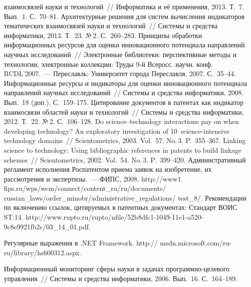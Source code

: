 \begin{multicols}{2}
{{\begin{thebibliography}{99}
взаимосвязей науки и технологий~// Информа\-тика и её применения, 2013. Т.~7. Вып.~1. 
С.~70--81.
 Архитектурные 
решения для систем вы\-чис\-ле\-ния индикаторов тематических взаимосвязей науки и 
технологий~// Сис\-те\-мы и средства информатики, 2013. Т.~23. №\,2. С.~260--283.
 Принципы обработки информационных ресурсов для 
оценки инновационного потенциала направлений научных исследований~// Электронные 
библиотеки: перспективные методы и технологии, электронные коллекции: Труды \mbox{9-й} 
Всеросс. научн. конф. RCDL'2007.~---  Переславль: Университет города Переславля, 2007. 
С.~35--44.
 Информационные ресурсы и индикаторы 
для оценки инновационного потенциала направлений научных исследований~// Сис\-те\-мы 
и средства информатики, 2008. Вып.~18 (доп.). С.~159--175.
 Цитирование документов в патентах как индикатор взаимосвязи 
областей науки и технологий~// Сис\-те\-мы и средства информатики, 2012. Т.~22. №\,2. 
С.~106--128.
 Do 
science--technology interactions pay on when developing technology? An exploratory investigation 
of 10~science-intensive technology domains~// Scientometrics, 2003. Vol.~57. No.\,3. 
P.~355--367.
 Linking 
science to technology: Using bibliographic references in patents to build linkage schemes~// 
Scientometrics, 2002. Vol.~54. No.\,3. P.~399--420.
Административный регламент исполнения Роспатентом приема заявок на изобретение, их 
рас\-смот\-ре\-ния и экспертизы.~--- ФИПС, 2008. {\sf 
http://www1. fips.ru/wps/wcm/connect/content\_ru/ru/documents/ 
russian\_laws/order\_minobr/administrative\_regulations/ test\_8/}.
Рекомендации по включению ссылок, цитируемых в патентных документах: Стандарт \mbox{ВОИС} 
ST.14. {\sf http://www.rupto.ru/rupto/nfile/52b8dfc1-1049-11e1-a520-9c8e9921fb2c/03\_14\_01.pdf}.


Регулярные выражения в .NET Framework. 
{\sf http:// msdn.microsoft.com/ru-ru/library/hs600312.aspx}.

 Информационный мониторинг сферы науки в задачах 
про\-грам\-мно-це\-ле\-во\-го управ\-ле\-ния~// Сис\-те\-мы и средства информатики, 2006. Вып.~16.  С.~164--189.
\columnbreak



\end{thebibliography}}}
\end{multicols}
